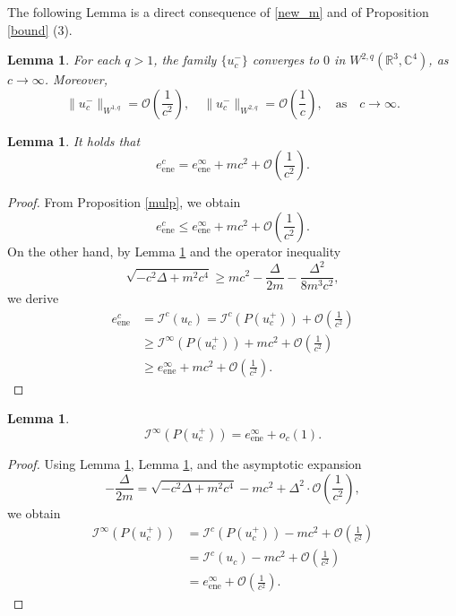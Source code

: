 \documentclass{amsart}
\theoremstyle{plain}
\newtheorem{lemma}[theorem]{Lemma}
\theoremstyle{definition}
\theoremstyle{remark}
\numberwithin{equation}{section} \numberwithin{figure}{section}
\begin{document}
The following Lemma is a direct consequence of \eqref{new_m} and of Proposition \ref{bound} (3).
\begin{lemma}\label{lemm:4.0}
  For each $q>1$, the family $\{u_c^-\}$ converges to $0$ in $W^{2,q}(\mathbb{R}^3,\mathbb{C}^4)$, as $c\to \infty$. Moreover, 
\begin{equation*}
  \| u_c^-\|_{W^{1,q}}=\mathcal{O}\left(\frac{1}{c^2}\right),\quad \| u_c^-\|_{W^{2,q}}=\mathcal{O}\left(\frac{1}{c}\right), \quad \text{as}\quad c\rightarrow \infty.
\end{equation*}
\end{lemma}
\begin{lemma}\label{stb_13}
  It holds that
  \[
  e_{\mathrm{ene}}^c = e_{\mathrm{ene}}^\infty + m c^2 + \mathcal{O}\left(\frac{1}{c^2}\right).
  \]
\end{lemma}

\begin{proof}
  From Proposition \ref{mulp}, we obtain
  \[
  e_{\mathrm{ene}}^c \leq e_{\mathrm{ene}}^\infty + m c^2 + \mathcal{O}\left(\frac{1}{c^2}\right).
  \]
  On the other hand, by Lemma \ref{lemm:4.0} and the operator inequality
  \[
  \sqrt{-c^2\Delta + m^2 c^4} \geq m c^2 - \frac{\Delta}{2m} - \frac{\Delta^2}{8m^3 c^2},
  \]
  we derive
  \begin{align*}
    e_{\mathrm{ene}}^c &= \mathcal{I}^c(u_c) = \mathcal{I}^c(P(u_c^+)) + \mathcal{O}\left(\frac{1}{c^2}\right) \\
    &\geq \mathcal{I}^\infty(P(u_c^+)) + m c^2 + \mathcal{O}\left(\frac{1}{c^2}\right) \\
    &\geq e_{\mathrm{ene}}^\infty + m c^2 + \mathcal{O}\left(\frac{1}{c^2}\right).
  \end{align*}
\end{proof}

\begin{lemma}\label{stb_14}
  \[
  \mathcal{I}^\infty(P(u_c^+)) = e_{\mathrm{ene}}^\infty + o_c(1).
  \]
\end{lemma}

\begin{proof}
  Using Lemma \ref{lemm:4.0}, Lemma \ref{stb_13}, and the asymptotic expansion
  \begin{equation}\label{rem_stb2}
        -\frac{\Delta}{2m} = \sqrt{-c^2\Delta + m^2 c^4} - m c^2 + \Delta^2 \cdot \mathcal{O}\left(\frac{1}{c^2}\right),
  \end{equation}
  we obtain
  \begin{align*}
    \mathcal{I}^\infty(P(u_c^+)) &= \mathcal{I}^c(P(u_c^+)) - m c^2 + \mathcal{O}\left(\frac{1}{c^2}\right) \\
    &= \mathcal{I}^c(u_c) - m c^2 + \mathcal{O}\left(\frac{1}{c^2}\right) \\
    &= e_{\mathrm{ene}}^\infty + \mathcal{O}\left(\frac{1}{c^2}\right).
  \end{align*}
\end{proof}
\end{document}
